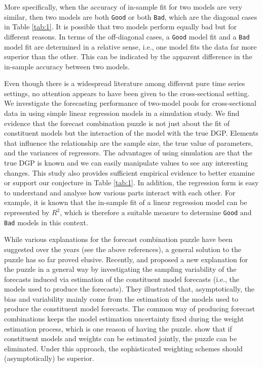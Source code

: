\documentclass{monashthesis}
\begin{document}
More specifically, when the accuracy of in-sample fit for two models are very similar, then two models are both \texttt{Good} or both \texttt{Bad}, which are the diagonal cases in Table \ref{tab:1}. It is possible that two models perform equally bad but for different reasons. In terms of the off-diagonal cases, a \texttt{Good} model fit and a \texttt{Bad} model fit are determined in a relative sense, i.e., one model fits the data far more superior than the other. This can be indicated by the apparent difference in the in-sample accuracy between two models.

Even though there is a widespread literature among different pure time series settings, no attention appears to have been given to the cross-sectional setting. We investigate the forecasting performance of two-model pools for cross-sectional data in using simple linear regression models in a simulation study. We find evidence that the forecast combination puzzle is not just about the fit of constituent models but the interaction of the model with the true DGP. Elements that influence the relationship are the sample size, the true value of parameters, and the variances of regressors. The advantages of using simulation are that the true DGP is known and we can easily manipulate values to see any interesting changes. This study also provides sufficient empirical evidence to better examine or support our conjecture in Table \ref{tab:1}. In addition, the regression form is easy to understand and analyse how various parts interact with each other. For example, it is known that the in-sample fit of a linear regression model can be represented by \(R^2\), which is therefore a suitable measure to determine \texttt{Good} and \texttt{Bad} models in this context.

While various explanations for the forecast combination puzzle have been suggested over the years (see the above references), a general solution to the puzzle has so far proved elusive. Recently, \textcite{ZMFP22} and \textcite{FZMP23} proposed a new explanation for the puzzle in a general way by investigating the sampling variability of the forecasts induced via estimation of the constituent model forecasts (i.e., the models used to produce the forecasts). They illustrated that, asymptotically, the bias and variability mainly come from the estimation of the models used to produce the constituent model forecasts. The common way of producing forecast combinations keeps the model estimation uncertainty fixed during the weight estimation process, which is one reason of having the puzzle. \textcite{FZMP23} show that if constituent models and weights can be estimated jointly, the puzzle can be eliminated. Under this approach, the sophisticated weighting schemes should (asymptotically) be superior.
\end{document}

